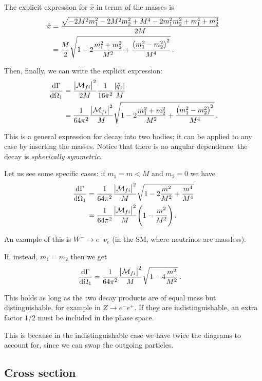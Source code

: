 \documentclass[main.tex]{subfiles}
\begin{document}
The explicit expression for \(\hat{x}\) in terms of the masses is 
%
\begin{align}
\hat{x} &= \frac{\sqrt{-2 M^2 m_1^2-2 M^2 m_2^2+M^4-2 m_1^2 m_2^2+m_1^4+m_2^4}}{2 M}  \\
&= \frac{M}{2} \sqrt{1 -2\frac{m_1^2+m_2^2}{M^2}+ \frac{\qty(m_1^2-m_2^2)^2}{M^{4}}}
\,.
\end{align}

Then, finally, we can write the explicit expression: 
%
\begin{align}
\dv{\Gamma }{\Omega_1 } 
&= \frac{\abs{\mathcal{M}_{fi}}^2}{2M}
\frac{1}{16 \pi^2}
\frac{\abs{\hat{q}_{1}}}{M}  \\
&= \frac{1}{64 \pi^2}
\frac{\abs{\mathcal{M}_{fi}}^2}{M}
\sqrt{1 -2\frac{m_1^2+m_2^2}{M^2}+ \frac{\qty(m_1^2-m_2^2)^2}{M^{4}}}
\,.
\end{align}

This is a general expression for decay into two bodies; it can be applied to any case by inserting the masses. 
Notice that there is no angular dependence: the decay is \emph{spherically symmetric}. 

Let us see some specific cases: if \(m_1 = m < M\) and \(m_2 = 0\) we have 
%
\begin{align}
\dv{\Gamma }{\Omega_1 } &= \frac{1}{64 \pi^2}
\frac{\abs{\mathcal{M}_{fi}}^2}{M}
\sqrt{1 - 2\frac{m^2}{M^2} + \frac{m^4}{M^{4}}}  \\
&= \frac{1}{64 \pi^2}
\frac{\abs{\mathcal{M}_{fi}}^2}{M}
\qty(1 - \frac{m^2}{M^2})
\,.
\end{align}

An example of this is \(W^{-} \to e^{-} \nu_{e}\) (in the SM, where neutrinos are massless).

If, instead, \(m_1 = m_2 \) then we get 
%
\begin{align}
\dv{\Gamma }{\Omega_1 } &= \frac{1}{64 \pi^2}
\frac{\abs{\mathcal{M}_{fi}}^2}{M}
\sqrt{1 - 4\frac{m^2}{M^2}}
\,.
\end{align}

This holds as long as the two decay products are of equal mass but distinguishable, for example in \(Z \to e^{-} e^{+}\). 
If they are indistinguishable, an extra factor \(1/2\) must be included in the phase space.

This is because in the indistinguishable case we have twice the diagrams to account for, since we can swap the outgoing particles.

\subsection{Cross section}
\end{document}

